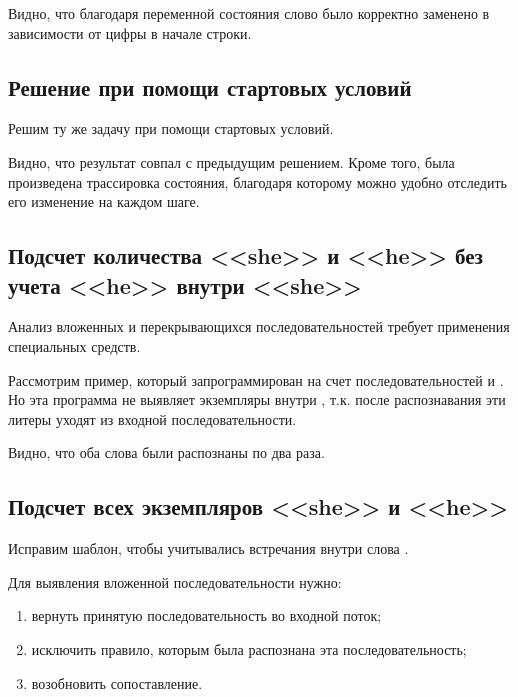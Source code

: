 

Видно, что благодаря переменной состояния слово  было корректно заменено в зависимости от цифры в начале строки.

\subsection{Решение при помощи стартовых условий}

Решим ту же задачу при помощи стартовых условий.



Видно, что результат совпал с предыдущим решением. Кроме того, была произведена трассировка состояния, благодаря которому можно удобно отследить его изменение на каждом шаге.

\subsection{Подсчет количества <<she>> и <<he>> без учета <<he>> внутри <<she>>}

Анализ вложенных и перекрывающихся последовательностей требует
применения специальных средств.

Рассмотрим пример, который запрограммирован на счет последовательностей  и . Но эта программа не выявляет экземпляры  внутри , т.к. после распознавания  эти литеры уходят из входной последовательности.



Видно, что оба слова были распознаны по два раза.

\subsection{Подсчет всех экземпляров <<she>> и <<he>>}

Исправим шаблон, чтобы учитывались встречания  внутри слова .

Для выявления вложенной последовательности нужно:
\begin{enumerate}
	\item вернуть принятую последовательность во входной поток;
	\item исключить правило, которым была распознана эта последовательность;
	\item возобновить сопоставление.
\end{enumerate}

